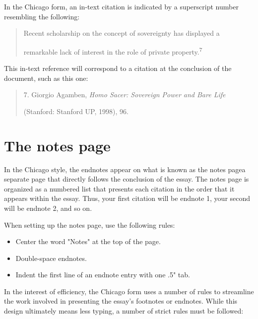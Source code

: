 In the Chicago form, an in-text citation is indicated by a superscript number resembling 
the following:

\begin{quote}
Recent scholarship on the concept of sovereignty has displayed a 

remarkable lack of interest in the role of private property.\textsuperscript{7}
\end{quote}
This in-text reference will correspond to a citation at the conclusion of the document, 
such as this one:

\begin{quote}
\hspace{.4in}7. Giorgio Agamben, \emph{Homo Sacer: Sovereign Power and Bare Life}

(Stanford: Stanford UP, 1998), 96.
\end{quote}


\section{The notes page}

In the Chicago style, the endnotes appear on what is known as the notes 
page\textemdash a separate page that directly follows the conclusion of the essay. The 
notes page is organized as a numbered list that presents each citation in the order that 
it appears within the essay. Thus, your first citation will be endnote 1, your second will 
be endnote 2, and so on.

When setting up the notes page, use the following rules:

\begin{itemize}
\item Center the word "Notes" at the top of the page.
\item Double-space endnotes.
\item Indent the first line of an endnote entry with one .5" tab.
\end{itemize}

In the interest of efficiency, the Chicago form uses a number of rules to streamline the 
work involved in presenting the essay's footnotes or endnotes. While this design 
ultimately means less typing, a number of strict rules must be followed:

